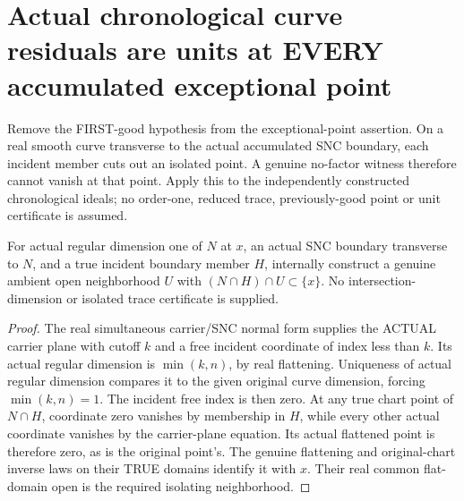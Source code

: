 \section{Actual chronological curve residuals are units at EVERY accumulated exceptional point}

Remove the FIRST-good hypothesis from the exceptional-point assertion.
On a real smooth curve transverse to the actual accumulated SNC boundary,
each incident member cuts out an isolated point. A genuine no-factor
witness therefore cannot vanish at that point. Apply this to the
independently constructed chronological ideals; no order-one, reduced
trace, previously-good point or unit certificate is assumed.

\begin{lemma}
\label{hir:sharp-actual-transverse-curve-member-isolating-open}
\leanok
For actual regular dimension one of $N$ at $x$, an actual SNC boundary
transverse to $N$, and a true incident boundary member $H$, internally
construct a genuine ambient open neighborhood $U$ with
$(N\cap H)\cap U\subset\{x\}$. No intersection-dimension or isolated
trace certificate is supplied.
\end{lemma}
\begin{proof}
The real simultaneous carrier/SNC normal form supplies the ACTUAL carrier
plane with cutoff $k$ and a free incident coordinate of index less than
$k$. Its actual regular dimension is $\min(k,n)$, by real flattening.
Uniqueness of actual regular dimension compares it to the given original
curve dimension, forcing $\min(k,n)=1$. The incident free index is then
zero. At any true chart point of $N\cap H$, coordinate zero vanishes by
membership in $H$, while every other actual coordinate vanishes by the
carrier-plane equation. Its actual flattened point is therefore zero,
as is the original point's. The genuine flattening and original-chart
inverse laws on their TRUE domains identify it with $x$. Their real
common flat-domain open is the required isolating neighborhood.
\end{proof}

